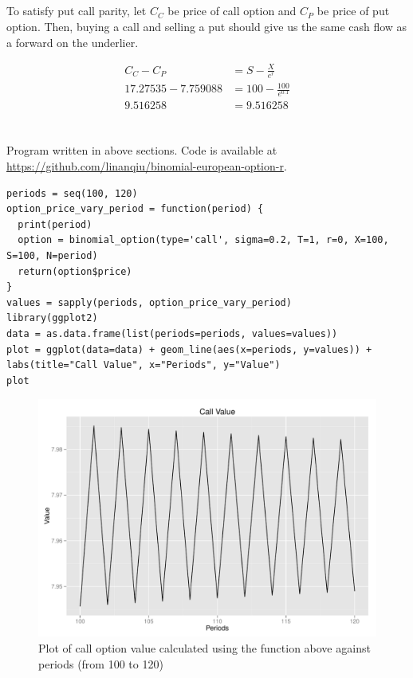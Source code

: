 \documentclass[11pt]{scrartcl}
\begin{document}
\subsection{}

To satisfy put call parity, let $C_C$ be price of call option and $C_P$ be price of put option. Then, buying a call and selling a put should give us the same cash flow as a forward on the underlier.

\begin{align*}
C_C - C_P &= S - \frac{X}{e^r} \\
17.27535 - 7.759088 &= 100 - \frac{100}{e^{0.1}} \\
9.516258 &= 9.516258
\end{align*}


\section{}

Program written in above sections. Code is available at \url{https://github.com/linanqiu/binomial-european-option-r}.

\begin{lstlisting}
periods = seq(100, 120)
option_price_vary_period = function(period) {
  print(period)
  option = binomial_option(type='call', sigma=0.2, T=1, r=0, X=100, S=100, N=period)
  return(option$price)
}
values = sapply(periods, option_price_vary_period)
library(ggplot2)
data = as.data.frame(list(periods=periods, values=values))
plot = ggplot(data=data) + geom_line(aes(x=periods, y=values)) + labs(title="Call Value", x="Periods", y="Value")
plot
\end{lstlisting}

\begin{figure}[H]
\centering\includegraphics[width=\textwidth]{./hw6/problem3-120.pdf}
\caption{Plot of call option value calculated using the function above against periods (from 100 to 120)}
\end{figure}
\end{document}
